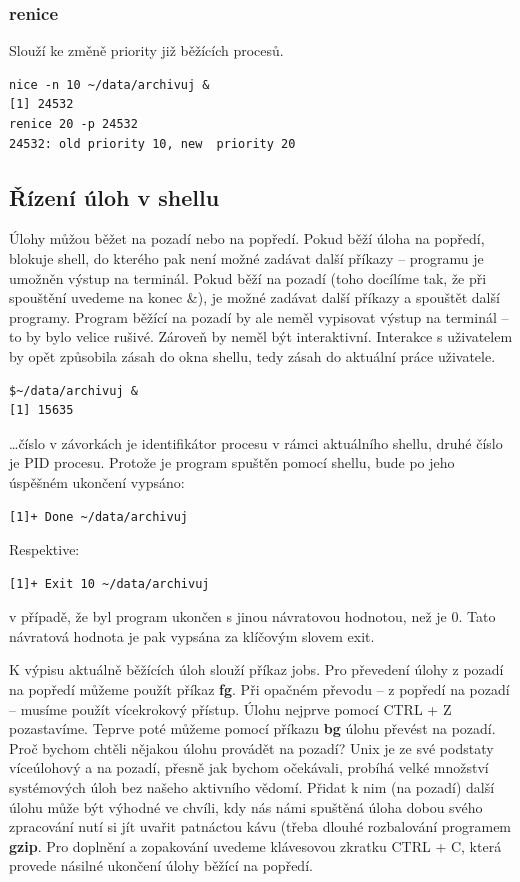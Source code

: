 \documentclass{article}
\begin{document}
\subsubsection{renice}
Slouží ke změně priority již běžících procesů.
\begin{verbatim}
nice -n 10 ~/data/archivuj &
[1] 24532
renice 20 -p 24532
24532: old priority 10, new  priority 20
\end{verbatim}

\subsection{Řízení úloh v shellu}
Úlohy můžou běžet na pozadí nebo na popředí. Pokud běží úloha na popředí, blokuje shell, do kterého pak není možné zadávat další příkazy -- programu je umožněn výstup na terminál. Pokud běží na pozadí (toho docílíme tak, že při spouštění uvedeme na konec \&), je možné zadávat další příkazy a spouštět další programy. Program běžící na pozadí by ale neměl vypisovat výstup na terminál -- to by bylo velice rušivé. Zároveň by neměl být interaktivní. Interakce s uživatelem by opět způsobila zásah do okna shellu, tedy zásah do aktuální práce uživatele.

\begin{verbatim}
$~/data/archivuj &
[1] 15635
\end{verbatim}
\dots číslo v závorkách je identifikátor procesu v rámci aktuálního shellu, druhé číslo je PID procesu. Protože je program spuštěn pomocí shellu, bude po jeho úspěšném ukončení vypsáno:
\begin{verbatim}
[1]+ Done ~/data/archivuj
\end{verbatim}
Respektive:
\begin{verbatim}
[1]+ Exit 10 ~/data/archivuj
\end{verbatim}
v případě, že byl program ukončen s jinou návratovou hodnotou, než je 0. Tato návratová hodnota je pak vypsána za klíčovým slovem exit.

K výpisu aktuálně běžících úloh slouží příkaz jobs. Pro převedení úlohy z pozadí na popředí můžeme použít příkaz \textbf{fg}. Při opačném převodu -- z popředí na pozadí -- musíme použít vícekrokový přístup. Úlohu nejprve pomocí CTRL + Z pozastavíme. Teprve poté můžeme pomocí příkazu \textbf{bg} úlohu převést na pozadí. Proč bychom chtěli nějakou úlohu provádět na pozadí? Unix je ze své podstaty víceúlohový a na pozadí, přesně jak bychom očekávali, probíhá velké množství systémových úloh bez našeho aktivního vědomí. Přidat k nim (na pozadí) další úlohu může být výhodné ve chvíli, kdy nás námi spuštěná úloha dobou svého zpracování nutí si jít uvařit patnáctou kávu (třeba dlouhé rozbalování programem \textbf{gzip}. Pro doplnění a zopakování uvedeme klávesovou zkratku CTRL + C, která provede násilné ukončení úlohy běžící na popředí.	
\end{document}
